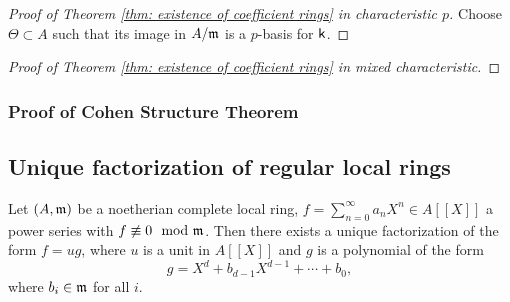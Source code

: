         \begin{proof}[Proof of Theorem \ref{thm: existence of coefficient rings} in characteristic \(p\)]
            Choose \(\Theta \subset A\) such that its image in \(A/{\mathfrak{m}}\) is a \(p\)-basis for \({\mathsf{k}}\).
            
        \end{proof}

        \begin{proof}[Proof of Theorem \ref{thm: existence of coefficient rings} in mixed characteristic]
        \end{proof}

        


    \subsubsection{Proof of Cohen Structure Theorem}

    
        


\subsection{Unique factorization of regular local rings}
    
    \begin{theorem}\label{thm: Weierstrass Preparation Theorem}
        Let \((A,{\mathfrak{m}})\) be a noetherian complete local ring, \(f = \sum_{n=0}^\infty a_n X^n \in A[[X]]\) a power series with \(f \not\equiv 0 \mod {{\mathfrak{m}}}\).
        Then there exists a unique factorization of the form \(f = u g\), where \(u\) is a unit in \(A[[X]]\) and \(g\) is a polynomial of the form
        \[ g = X^d + b_{d-1} X^{d-1} + \cdots + b_0, \]
        where \(b_i \in {\mathfrak{m}}\) for all \(i\).
    \end{theorem}




